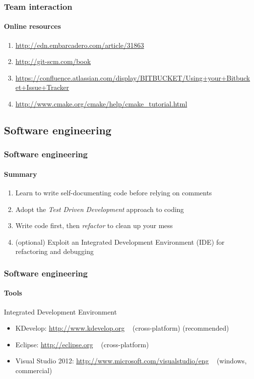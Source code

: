\begin{frame}
\frametitle{Team interaction}
\framesubtitle{Online resources}
\begin{enumerate}
\item \url{http://edn.embarcadero.com/article/31863}
\item \url{http://git-scm.com/book}
\item \url{https://confluence.atlassian.com/display/BITBUCKET/Using+your+Bitbucket+Issue+Tracker}
\item \url{http://www.cmake.org/cmake/help/cmake_tutorial.html}
\end{enumerate}
\end{frame}

\subsection{Software engineering}

\begin{frame}
\frametitle{Software engineering}
\framesubtitle{Summary}

\begin{enumerate}
\item Learn to write self-documenting code before relying on comments
\item Adopt the {\em Test Driven Development} approach to coding
\item Write code first, then {\em refactor} to clean up your mess
\item (optional) Exploit an Integrated Development Environment (IDE) for refactoring and debugging
\end{enumerate}

\end{frame}

\begin{frame}
\frametitle{Software engineering}
\framesubtitle{Tools}
\begin{block}{Integrated Development Environment}
\begin{itemize}
\item KDevelop: \url{http://www.kdevelop.org} \,\,\, (cross-platform) (recommended)
\item Eclipse: \url{http://eclipse.org} \,\,\, (cross-platform)
\item Visual Studio 2012: \url{http://www.microsoft.com/visualstudio/eng} \,\,\, (windows, commercial)
\end{itemize}
\end{block}
\end{frame}

